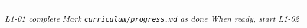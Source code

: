 \documentclass[11pt,a4paper]{article}
\begin{document}
\vspace{12pt}
{\color{highlight!50}\rule{\linewidth}{0.6pt}}
\begin{center}
\small\color{primary!60}
\textit{L1-01 complete} \quad\textbullet\quad
\textit{Mark \texttt{curriculum/progress.md} as done} \quad\textbullet\quad
\textit{When ready, start L1-02}
\end{center}
\end{document}
